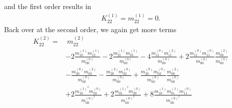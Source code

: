 and the first order results in
\begin{equation*}
  \begin{aligned}
    K_{22}^{(1)} = m_{22}^{(1)} =  0.
  \end{aligned}
\end{equation*}
Back over at the second order, we again get more terms
\begin{equation*}
  \begin{aligned}
    K_{22}^{(2)}
    = &\
    m_{22}^{(2)}
    \\&
    - 2 \frac{ m_{10}^{(1)} m_{12}^{(1)} }{m_{00}^{(0)}}
    - 2 \frac{ m_{21}^{(1)} m_{01}^{(1)} }{m_{00}^{(0)}}
    - 4 \frac{ m_{11}^{(0)} m_{11}^{(2)} }{m_{00}^{(0)}}
    + 2 \frac{ m_{11}^{(0)} m_{11}^{(0)} }{m_{00}^{(0)}}\frac{ m_{00}^{(2)} }{m_{00}^{(0)}}
    \\&
    - \frac{ m_{20}^{(0)} m_{02}^{(2)} }{m_{00}^{(0)}}
    - \frac{ m_{20}^{(2)} m_{02}^{(0)} }{m_{00}^{(0)}}
    + \frac{ m_{20}^{(0)} m_{02}^{(0)} }{m_{00}^{(0)}}\frac{ m_{00}^{(2)} }{m_{00}^{(0)}}
    \\&
    + 2 \frac{ m_{10}^{{(1)}^2} m_{02}^{(0)} }{m_{00}^{{(0)}^2}}
    + 2 \frac{ m_{01}^{{(1)}^2} m_{20}^{(0)} }{m_{00}^{{(0)}^2}}
    + 8 \frac{ m_{10}^{(1)}m_{01}^{(1)} m_{11}^{(0)} }{m_{00}^{{(0)}^2}}
  \end{aligned}
\end{equation*}


